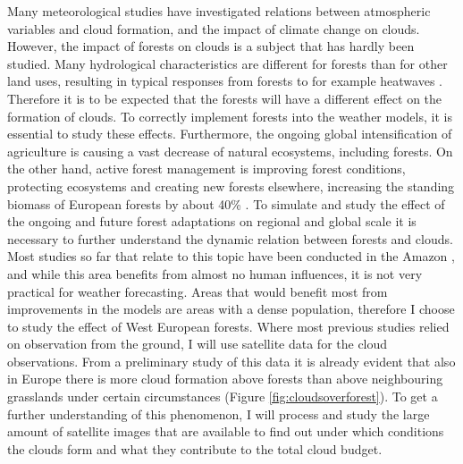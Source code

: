 \documentclass{article}
\begin{document}
Many meteorological studies have investigated relations between atmospheric variables and cloud formation, and the impact of climate change on clouds. However, the impact of forests on clouds is a subject that has hardly been studied. Many hydrological characteristics are different for forests than for other land uses, resulting in typical responses from forests to for example heatwaves \parencite{teuling10}. Therefore it is to be expected that the forests will have a different effect on the formation of clouds. To correctly implement forests into the weather models, it is essential to study these effects. Furthermore, the ongoing global intensification of agriculture is causing a vast decrease of natural ecosystems, including forests. On the other hand, active forest management is improving forest conditions, protecting ecosystems and creating new forests elsewhere, increasing the standing biomass of European forests by about 40\% \parencite{foley05}. To simulate and study the effect of the ongoing and future forest adaptations on regional and global scale it is necessary to further understand the dynamic relation between forests and clouds.\\

Most studies so far that relate to this topic have been conducted in the Amazon \parencite{chagnon04}, and while this area benefits from almost no human influences, it is not very practical for weather forecasting. Areas that would benefit most from improvements in the models are areas with a dense population, therefore I choose to study the effect of West European forests. Where most previous studies relied on observation from the ground,  I will use satellite data for the cloud observations. From a preliminary study of this data it is already evident that also in Europe there is more cloud formation above forests than above neighbouring grasslands under certain circumstances (Figure \ref{fig:cloudsoverforest}). To get a further understanding of this phenomenon, I will process and study the large amount of satellite images that are available to find out under which conditions the clouds form and what they contribute to the total cloud budget.
\end{document}
